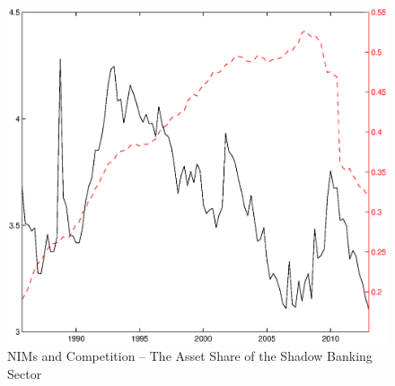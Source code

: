 \documentclass[11pt]{article}
\begin{document}
\clearpage
\begin{figure}
\flushleft
\caption{NIMs and Competition -- The Asset Share of the Shadow Banking Sector} \label{figure_nims_competition}

\hspace{-2.5cm} \includegraphics[scale=0.85]{figure_nims_competition.ps}
\end{figure}
\end{document}
